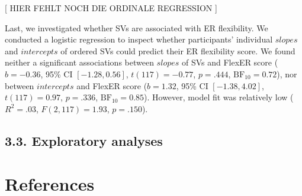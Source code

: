 \documentclass[
  man,floatsintext]{apa6}
\begin{document}
{[} HIER FEHLT NOCH DIE ORDINALE REGRESSION {]}

Last, we investigated whether SVs are associated with ER flexibility.
We conducted a logistic regression to inspect whether participants' individual \(slopes\) and \(intercepts\) of ordered SVs could predict their ER flexibility score.
We found neither a significant associations between \(slopes\) of SVs and FlexER score (\(b = -0.36\), 95\% CI \([-1.28, 0.56]\), \(t(117) = -0.77\), \(p = .444\), \(\mathrm{BF}_{\textrm{10}} = 0.72\)), nor between \(intercepts\) and FlexER score (\(b = 1.32\), 95\% CI \([-1.38, 4.02]\), \(t(117) = 0.97\), \(p = .336\), \(\mathrm{BF}_{\textrm{10}} = 0.85\)).
However, model fit was relatively low (\(R^2 = .03\), \(F(2, 117) = 1.93\), \(p = .150\)).

\hypertarget{exploratory-analyses}{%
\subsection{3.3. Exploratory analyses}\label{exploratory-analyses}}

\hypertarget{references}{%
\section{References}\label{references}}

\begingroup
\setlength{\parindent}{-0.5in}
\setlength{\leftskip}{0.5in}
\end{document}
